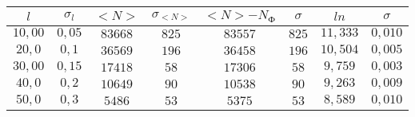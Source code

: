 \begin{tabular}{| c | c | c | c | c | c | c | c |}
\hline
$l$ & $\sigma_l$ & $<N>$ & $\sigma_{<N>}$ & $<N>-N_Ф$ & $\sigma$ & $ln$ & $\sigma$\\
\hline
$10,00$ & $0,05$ & $83668$ & $825$ & $83557$ & $825$ & $11,333$ & $0,010$\\
\hline
$20,0$ & $0,1$ & $36569$ & $196$ & $36458$ & $196$ & $10,504$ & $0,005$\\
\hline
$30,00$ & $0,15$ & $17418$ & $58$ & $17306$ & $58$ & $9,759$ & $0,003$\\
\hline
$40,0$ & $0,2$ & $10649$ & $90$ & $10538$ & $90$ & $9,263$ & $0,009$\\
\hline
$50,0$ & $0,3$ & $5486$ & $53$ & $5375$ & $53$ & $8,589$ & $0,010$\\
\hline
\end{tabular}
